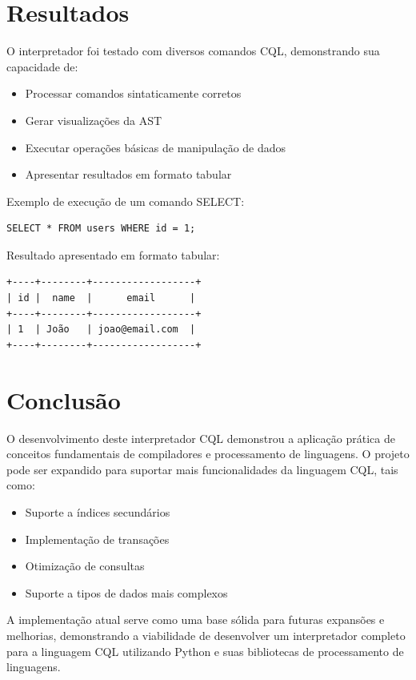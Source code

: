 \documentclass[12pt]{article}
\begin{document}
\section{Resultados}
O interpretador foi testado com diversos comandos CQL, demonstrando sua capacidade de:
\begin{itemize}
    \item Processar comandos sintaticamente corretos
    \item Gerar visualizações da AST
    \item Executar operações básicas de manipulação de dados
    \item Apresentar resultados em formato tabular
\end{itemize}

Exemplo de execução de um comando SELECT:

\begin{verbatim}
SELECT * FROM users WHERE id = 1;
\end{verbatim}

Resultado apresentado em formato tabular:
\begin{verbatim}
+----+--------+------------------+
| id |  name  |      email      |
+----+--------+------------------+
| 1  | João   | joao@email.com  |
+----+--------+------------------+
\end{verbatim}

\section{Conclusão}
O desenvolvimento deste interpretador CQL demonstrou a aplicação prática de conceitos 
fundamentais de compiladores e processamento de linguagens. O projeto pode ser expandido 
para suportar mais funcionalidades da linguagem CQL, tais como:
\begin{itemize}
    \item Suporte a índices secundários
    \item Implementação de transações
    \item Otimização de consultas
    \item Suporte a tipos de dados mais complexos
\end{itemize}

A implementação atual serve como uma base sólida para futuras expansões e melhorias, 
demonstrando a viabilidade de desenvolver um interpretador completo para a linguagem CQL 
utilizando Python e suas bibliotecas de processamento de linguagens.
\end{document}
